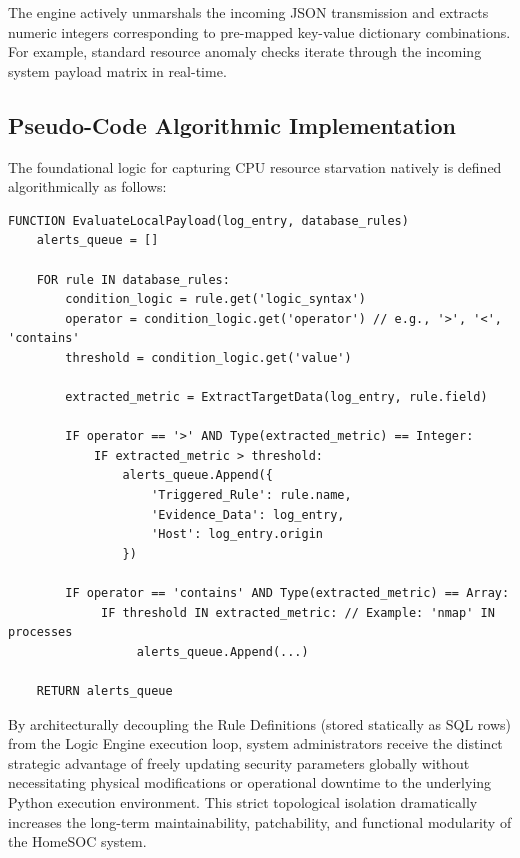 The engine actively unmarshals the incoming JSON transmission and extracts numeric integers corresponding to pre-mapped key-value dictionary combinations.
For example, standard resource anomaly checks iterate through the incoming system payload matrix in real-time. 

\subsection{Pseudo-Code Algorithmic Implementation}
The foundational logic for capturing CPU resource starvation natively is defined algorithmically as follows:

\begin{verbatim}
FUNCTION EvaluateLocalPayload(log_entry, database_rules)
    alerts_queue = []
    
    FOR rule IN database_rules:
        condition_logic = rule.get('logic_syntax')
        operator = condition_logic.get('operator') // e.g., '>', '<', 'contains'
        threshold = condition_logic.get('value')
        
        extracted_metric = ExtractTargetData(log_entry, rule.field)
        
        IF operator == '>' AND Type(extracted_metric) == Integer:
            IF extracted_metric > threshold:
                alerts_queue.Append({
                    'Triggered_Rule': rule.name,
                    'Evidence_Data': log_entry,
                    'Host': log_entry.origin
                })
        
        IF operator == 'contains' AND Type(extracted_metric) == Array:
             IF threshold IN extracted_metric: // Example: 'nmap' IN processes
                  alerts_queue.Append(...)
                  
    RETURN alerts_queue
\end{verbatim}

By architecturally decoupling the Rule Definitions (stored statically as SQL rows) from the Logic Engine execution loop, system administrators receive the distinct strategic advantage of freely updating security parameters globally without necessitating physical modifications or operational downtime to the underlying Python execution environment. This strict topological isolation dramatically increases the long-term maintainability, patchability, and functional modularity of the HomeSOC system.

